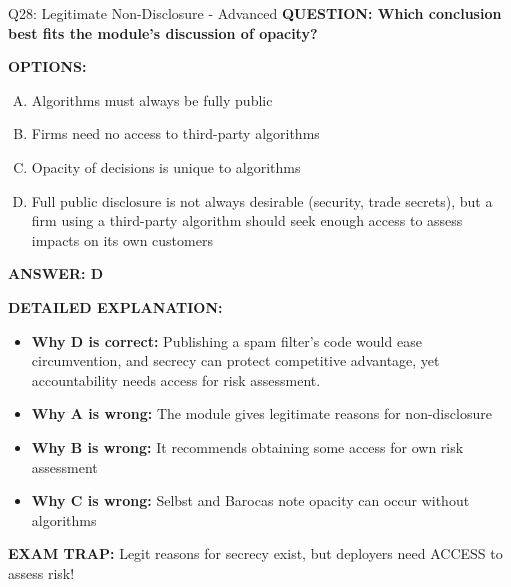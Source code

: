 \documentclass[8pt]{beamer}
\begin{document}
\begin{frame}[shrink=6]{Q28: Legitimate Non-Disclosure - Advanced}
\fontsize{6.5}{7.5}\selectfont
\textbf{QUESTION: Which conclusion best fits the module's discussion of opacity?}

\vspace{0.1cm}
\textbf{OPTIONS:}
\begin{enumerate}[A.]
\item Algorithms must always be fully public
\item Firms need no access to third-party algorithms
\item Opacity of decisions is unique to algorithms
\item Full public disclosure is not always desirable (security, trade secrets), but a firm using a third-party algorithm should seek enough access to assess impacts on its own customers
\end{enumerate}

\vspace{0.1cm}
\textcolor{myblue}{\textbf{ANSWER: D}}

\vspace{0.1cm}
\textbf{DETAILED EXPLANATION:}
\begin{itemize}
\item \textbf{Why D is correct:} Publishing a spam filter's code would ease circumvention, and secrecy can protect competitive advantage, yet accountability needs access for risk assessment.
\item \textbf{Why A is wrong:} The module gives legitimate reasons for non-disclosure
\item \textbf{Why B is wrong:} It recommends obtaining some access for own risk assessment
\item \textbf{Why C is wrong:} Selbst and Barocas note opacity can occur without algorithms
\end{itemize}

\textcolor{myred}{\textbf{EXAM TRAP:}} Legit reasons for secrecy exist, but deployers need ACCESS to assess risk!
\end{frame}

\end{document}
